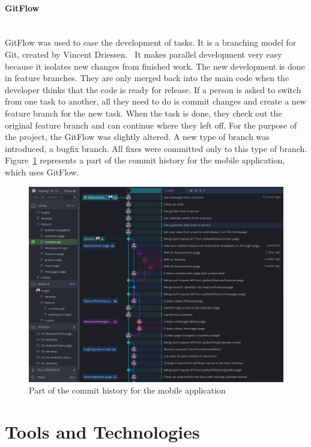 \paragraph{\large{GitFlow}}\mbox{}\\[2pt]
GitFlow was used to ease the development of tasks. It is a branching model for Git, created by Vincent Driessen.~\cite{gitflow} It makes parallel development very easy because it isolates new changes from finished work. The new development is done in feature branches. They are only merged back into the main code when the developer thinks that the code is ready for release. If a person is asked to switch from one task to another, all they need to do is commit changes and create a new feature branch for the new task. When the task is done, they check out the original feature branch and can continue where they left off.
For the purpose of the project, the GitFlow was slightly altered. A new type of branch was introduced, a bugfix branch. All fixes were committed only to this type of branch. Figure~\ref{fig:gitflow} represents a part of the commit history for the mobile application, which uses GitFlow.

\begin{figure}[htb]
    \centering
    \includegraphics[width=\textwidth]{fig04/gitflow.png}
    \caption{Part of the commit history for the mobile application} \label{fig:gitflow}
\end{figure}

\section{Tools and Technologies}
